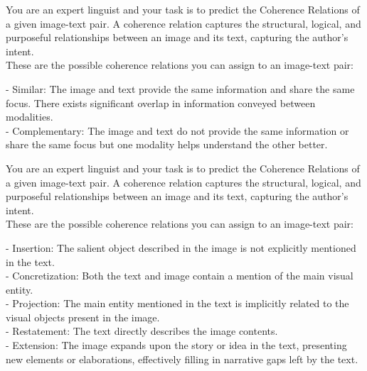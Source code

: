 \begin{figure*}[t]
    \centering
    \begin{tcolorbox}[title={System Message for DisREL}, after skip=0pt, boxsep=5pt, width=\textwidth]

    You are an expert linguist and your task is to predict the Coherence Relations of a given image-text pair. A coherence relation captures the structural, logical, and purposeful relationships between an image and its text, capturing the author's intent. \\
    
    These are the possible coherence relations you can assign to an image-text pair:
    
    - Similar: The image and text provide the same information and share the same focus. There exists significant overlap in information conveyed between modalities. \\
    - Complementary: The image and text do not provide the same information or share the same focus but one modality helps understand the other better.
    
    \end{tcolorbox}
\end{figure*}

\begin{figure*}[t]
    \centering
    \begin{tcolorbox}[title={System Message for Tweet Subtitles}, colframe = blue!30, colback = blue!10, coltitle = blue!20!black, after skip=0pt, boxsep=5pt, width=\textwidth]

    You are an expert linguist and your task is to predict the Coherence Relations of a given image-text pair. A coherence relation captures the structural, logical, and purposeful relationships between an image and its text, capturing the author's intent. \\
    
    These are the possible coherence relations you can assign to an image-text pair:
    
    - Insertion: The salient object described in the image is not explicitly mentioned in the text. \\
    - Concretization: Both the text and image contain a mention of the main visual entity. \\
    - Projection: The main entity mentioned in the text is implicitly related to the visual objects present in the image. \\
    - Restatement: The text directly describes the image contents. \\
    - Extension: The image expands upon the story or idea in the text, presenting new elements or elaborations, effectively filling in narrative gaps left by the text.
    
    \end{tcolorbox}
\end{figure*}

